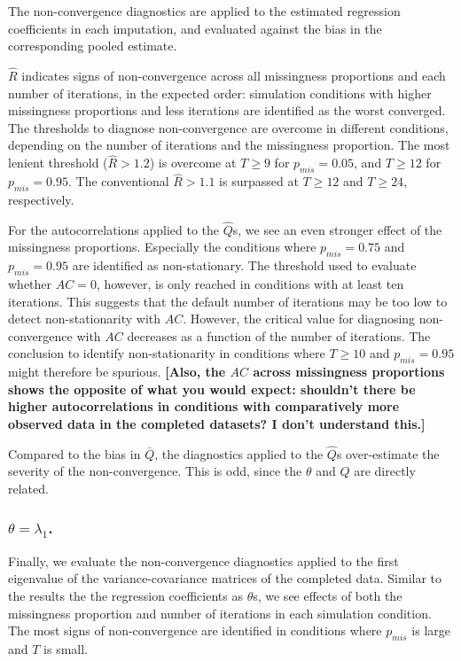 \documentclass[Royal,times,sageh]{sagej}
\begin{document}
The non-convergence diagnostics are applied to the estimated regression coefficients in each imputation, and evaluated against the bias in the corresponding pooled estimate.

\(\widehat{R}\) indicates signs of non-convergence across all missingness proportions and each number of iterations, in the expected order: simulation conditions with higher missingness proportions and less iterations are identified as the worst converged. The thresholds to diagnose non-convergence are overcome in different conditions, depending on the number of iterations and the missingness proportion. The most lenient threshold (\(\widehat{R}>1.2\)) is overcome at \(T\geq9\) for \(p_{mis} = 0.05\), and \(T\geq12\) for \(p_{mis} = 0.95\). The conventional \(\widehat{R}>1.1\) is surpassed at \(T\geq12\) and \(T\geq24\), respectively.

For the autocorrelations applied to the \(\hat{Q}\)s, we see an even stronger effect of the missingness proportions. Especially the conditions where \(p_{mis} = 0.75\) and \(p_{mis} = 0.95\) are identified as non-stationary. The threshold used to evaluate whether \(AC=0\), however, is only reached in conditions with at least ten iterations. This suggests that the default number of iterations may be too low to detect non-stationarity with \(AC\). However, the critical value for diagnosing non-convergence with \(AC\) decreases as a function of the number of iterations. The conclusion to identify non-stationarity in conditions where \(T\geq10\) and \(p_{mis} = 0.95\) might therefore be spurious. \textbf{{[}Also, the \(AC\) across missingness proportions shows the opposite of what you would expect: shouldn't there be higher autocorrelations in conditions with comparatively more observed data in the completed datasets? I don't understand this.{]}}

Compared to the bias in \(\bar{Q}\), the diagnostics applied to the \(\hat{Q}\)s over-estimate the severity of the non-convergence. This is odd, since the \(\theta\) and \(Q\) are directly related.

\hypertarget{thetalambda_1.}{%
\subsubsection{\texorpdfstring{\(\theta=\lambda_1\).}{\textbackslash theta=\textbackslash lambda\_1.}}\label{thetalambda_1.}}

Finally, we evaluate the non-convergence diagnostics applied to the first eigenvalue of the variance-covariance matrices of the completed data. Similar to the results the the regression coefficients as \(\theta\)s, we see effects of both the missingness proportion and number of iterations in each simulation condition. The most signs of non-convergence are identified in conditions where \(p_{mis}\) is large and \(T\) is small.
\end{document}
